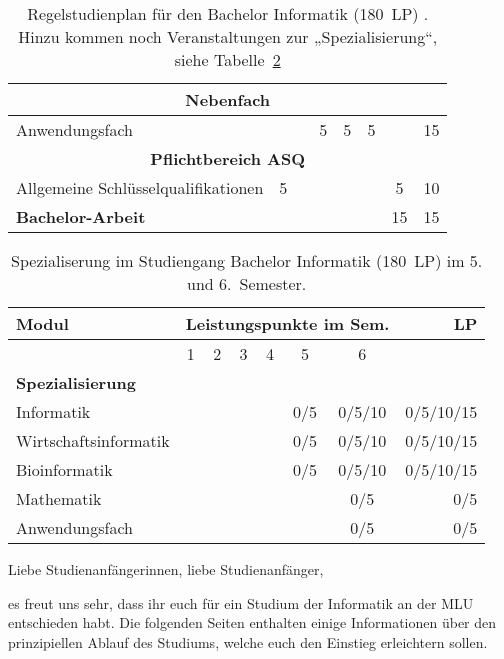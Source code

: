 \begin{table}[tbp]
\begin{small}
\begin{tabularx}{\textwidth}{|X||c|c|c|c|c|c||r|}
			\multicolumn{8}{|c|}{\textbf{Nebenfach}}\\\hline
			Anwendungsfach&&&5&5&5&&15\\\hline\hline
			\multicolumn{8}{|c|}{\textbf{Pflichtbereich ASQ}}\\\hline
			Allgemeine Schlüsselqualifikationen&5&&&&&5&10\\\hline\hline
			\textbf{Bachelor-Arbeit}&&&&&&15&15\\\hline
		\end{tabularx}
	\end{small}
	\caption{Regelstudienplan für den Bachelor Informatik (180~LP)
		\label{plan-info}. Hinzu kommen noch Veranstaltungen zur „Spezialisierung“, siehe Tabelle~\ref{plan-info2}}
\end{table}

\begin{table}[!th]
	\begin{small}
		\begin{tabularx}{\textwidth}{|X||c|c|c|c|c|c||r|}
			\hline
			\textbf{Modul}&\multicolumn{6}{l||}{\textbf{Leistungspunkte im Sem.}}&\textbf{LP}\\\hline
			&1&2&3&4&5&6&\\\hline\hline
			\multicolumn{8}{|X|}{\textbf{Spezialisierung}}\\\hline
			Informatik&&&&&0/5&0/5/10&0/5/10/15\\
			Wirtschaftsinformatik&&&&&0/5&0/5/10&0/5/10/15\\
			Bioinformatik&&&&&0/5&0/5/10&0/5/10/15\\
			Mathematik&&&&&&0/5&0/5\\
			Anwendungsfach&&&&&&0/5&0/5\\\hline
		\end{tabularx}
	\end{small}
	\caption{Spezialiserung im Studiengang Bachelor Informatik (180~LP) im 5. und 6.~Semester. \label{plan-info2}}
\end{table}

Liebe Studienanfängerinnen, liebe Studienanfänger,\par

es freut uns sehr, dass ihr euch für ein Studium der Informatik an der MLU entschieden habt. Die folgenden Seiten enthalten einige Informationen über den prinzipiellen Ablauf des Studiums, welche euch den Einstieg erleichtern sollen.\par

